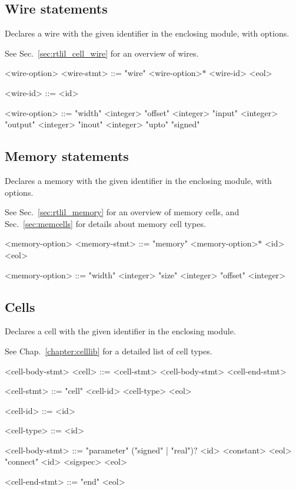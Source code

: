 \subsection{Wire statements}

Declares a wire with the given identifier in the enclosing module, with options.

See Sec.~\ref{sec:rtlil_cell_wire} for an overview of wires.

\begin{indentgrammar}{<wire-option>}
<wire-stmt> ::= "wire" <wire-option>$*$ <wire-id> <eol>

<wire-id> ::= <id>

<wire-option> ::= 
"width" <integer>
  \alt "offset" <integer>
  \alt "input" <integer>
  \alt "output" <integer>
  \alt "inout" <integer>
  \alt "upto"
  \alt "signed"
\end{indentgrammar}

\subsection{Memory statements}

Declares a memory with the given identifier in the enclosing module, with options.

See Sec.~\ref{sec:rtlil_memory} for an overview of memory cells, and Sec.~\ref{sec:memcells} for details about memory cell types.

\begin{indentgrammar}{<memory-option>}
<memory-stmt> ::= "memory" <memory-option>$*$ <id> <eol>

<memory-option> ::= 
"width" <integer>
  \alt "size" <integer>
  \alt "offset" <integer>
\end{indentgrammar}

\subsection{Cells}

Declares a cell with the given identifier in the enclosing module.

See Chap.~\ref{chapter:celllib} for a detailed list of cell types.

\begin{indentgrammar}{<cell-body-stmt>}
<cell> ::= <cell-stmt> <cell-body-stmt> <cell-end-stmt>

<cell-stmt> ::= "cell" <cell-id> <cell-type> <eol>

<cell-id> ::= <id>

<cell-type> ::= <id>

<cell-body-stmt> ::= 
"parameter" ("signed" | "real")$?$ <id> <constant> <eol>
  \alt "connect" <id> <sigspec> <eol>

<cell-end-stmt> ::= "end" <eol>
\end{indentgrammar}

